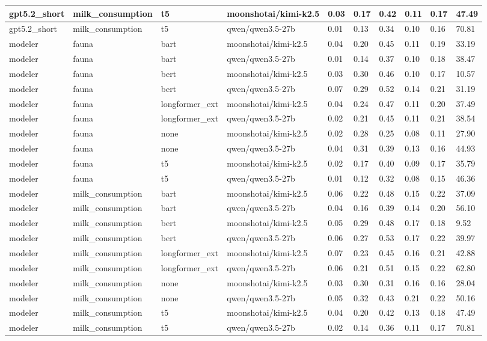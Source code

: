 \begin{tabular}{|l|l|l|l|l|l|l|l|l|l|}
 \hline
 gpt5.2\_short & milk\_consumption & t5 & moonshotai/kimi-k2.5 & 0.03 & 0.17 & 0.42 & 0.11 & 0.17 & 47.49 \\
 \hline
 gpt5.2\_short & milk\_consumption & t5 & qwen/qwen3.5-27b & 0.01 & 0.13 & 0.34 & 0.10 & 0.16 & 70.81 \\
 \hline
 modeler & fauna & bart & moonshotai/kimi-k2.5 & 0.04 & 0.20 & 0.45 & 0.11 & 0.19 & 33.19 \\
 \hline
 modeler & fauna & bart & qwen/qwen3.5-27b & 0.01 & 0.14 & 0.37 & 0.10 & 0.18 & 38.47 \\
 \hline
 modeler & fauna & bert & moonshotai/kimi-k2.5 & 0.03 & 0.30 & 0.46 & 0.10 & 0.17 & 10.57 \\
 \hline
 modeler & fauna & bert & qwen/qwen3.5-27b & 0.07 & 0.29 & 0.52 & 0.14 & 0.21 & 31.19 \\
 \hline
 modeler & fauna & longformer\_ext & moonshotai/kimi-k2.5 & 0.04 & 0.24 & 0.47 & 0.11 & 0.20 & 37.49 \\
 \hline
 modeler & fauna & longformer\_ext & qwen/qwen3.5-27b & 0.02 & 0.21 & 0.45 & 0.11 & 0.21 & 38.54 \\
 \hline
 modeler & fauna & none & moonshotai/kimi-k2.5 & 0.02 & 0.28 & 0.25 & 0.08 & 0.11 & 27.90 \\
 \hline
 modeler & fauna & none & qwen/qwen3.5-27b & 0.04 & 0.31 & 0.39 & 0.13 & 0.16 & 44.93 \\
 \hline
 modeler & fauna & t5 & moonshotai/kimi-k2.5 & 0.02 & 0.17 & 0.40 & 0.09 & 0.17 & 35.79 \\
 \hline
 modeler & fauna & t5 & qwen/qwen3.5-27b & 0.01 & 0.12 & 0.32 & 0.08 & 0.15 & 46.36 \\
 \hline
 modeler & milk\_consumption & bart & moonshotai/kimi-k2.5 & 0.06 & 0.22 & 0.48 & 0.15 & 0.22 & 37.09 \\
 \hline
 modeler & milk\_consumption & bart & qwen/qwen3.5-27b & 0.04 & 0.16 & 0.39 & 0.14 & 0.20 & 56.10 \\
 \hline
 modeler & milk\_consumption & bert & moonshotai/kimi-k2.5 & 0.05 & 0.29 & 0.48 & 0.17 & 0.18 & 9.52 \\
 \hline
 modeler & milk\_consumption & bert & qwen/qwen3.5-27b & 0.06 & 0.27 & 0.53 & 0.17 & 0.22 & 39.97 \\
 \hline
 modeler & milk\_consumption & longformer\_ext & moonshotai/kimi-k2.5 & 0.07 & 0.23 & 0.45 & 0.16 & 0.21 & 42.88 \\
 \hline
 modeler & milk\_consumption & longformer\_ext & qwen/qwen3.5-27b & 0.06 & 0.21 & 0.51 & 0.15 & 0.22 & 62.80 \\
 \hline
 modeler & milk\_consumption & none & moonshotai/kimi-k2.5 & 0.03 & 0.30 & 0.31 & 0.16 & 0.16 & 28.04 \\
 \hline
 modeler & milk\_consumption & none & qwen/qwen3.5-27b & 0.05 & 0.32 & 0.43 & 0.21 & 0.22 & 50.16 \\
 \hline
 modeler & milk\_consumption & t5 & moonshotai/kimi-k2.5 & 0.04 & 0.20 & 0.42 & 0.13 & 0.18 & 47.49 \\
 \hline
 modeler & milk\_consumption & t5 & qwen/qwen3.5-27b & 0.02 & 0.14 & 0.36 & 0.11 & 0.17 & 70.81 \\
\hline
\end{tabular}
